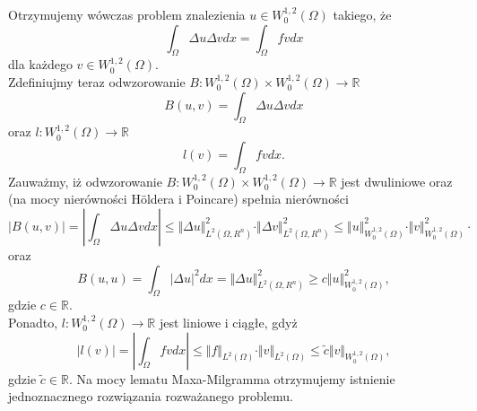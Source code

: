 \documentclass[12pt,a4paper,oneside,titlepage]{article}
\begin{document}
\indent
Otrzymujemy wówczas problem znalezienia $u \in W^{1,2}_0(\Omega)$ takiego, że
\begin{equation}
\int_{\Omega} \Delta u \Delta v dx = \int_{\Omega} f v dx
\end{equation}
dla każdego $v \in W^{1,2}_0 (\Omega)$. \\
\medskip
Zdefiniujmy teraz odwzorowanie $B:W^{1,2}_0(\Omega) \times W^{1,2}_0(\Omega) \rightarrow \mathbb{R} $
\begin{equation}
\nonumber
B(u,v) = \int_{\Omega} \Delta u \Delta v dx
\end{equation}
oraz $l: W^{1,2}_0(\Omega) \rightarrow \mathbb{R}$ 
\begin{equation}
\nonumber
l(v) = \int_{\Omega} f v dx .
\end{equation}
Zauważmy, iż odwzorowanie $B:W^{1,2}_0(\Omega) \times W^{1,2}_0(\Omega) \rightarrow \mathbb{R} $ jest dwuliniowe oraz (na mocy nierówności Höldera i Poincare) spełnia nierówności
\begin{equation}
\nonumber
\vert B(u,v) \vert = \left\vert \int_{\Omega} \Delta u \Delta v dx \right\vert \leq \Vert \Delta u \Vert^2_{L^2(\Omega,R^n)} \cdot \Vert \Delta v \Vert^2_{L^2(\Omega,R^n)} \leq \Vert u \Vert^2_{W^{1,2}_0 (\Omega)} \cdot \Vert v \Vert^2_{W^{1,2}_0 (\Omega)} \cdot 
\end{equation}
oraz
\begin{equation}
\nonumber
B(u,u) = \int_{\Omega} \vert \Delta u \vert^2 dx = \Vert \Delta u \Vert^2_{L^2(\Omega,R^n)} \geq c \Vert u \Vert_{W^{1,2}_0(\Omega)}^2,
\end{equation}
gdzie $c \in \mathbb{R}$. \\
Ponadto, $l: W^{1,2}_0(\Omega) \rightarrow \mathbb{R}$ jest liniowe i ciągłe, gdyż
\begin{equation}
\nonumber
\vert l(v) \vert = \left\vert \int_{\Omega} f v dx \right\vert \leq \Vert f \Vert_{L^2(\Omega)} \cdot \Vert v \Vert_{L^2(\Omega)} \leq \widetilde{c} \Vert v \Vert_{W^{1,2}_0 (\Omega)},
\end{equation}
gdzie $\widetilde{c} \in \mathbb{R}$. Na mocy lematu Maxa-Milgramma otrzymujemy istnienie jednoznacznego rozwiązania rozważanego problemu.
\end{document}
